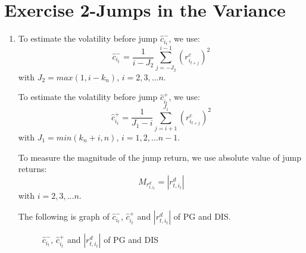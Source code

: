 \documentclass[12pt,letterpaper]{article}
\begin{document}
\section*{Exercise 2-Jumps in the Variance}
  \begin{enumerate}[label=\textbf{(\Alph*)}]
\item To estimate the volatility before jump $\hat{c}_{i_t}^-$, we use:
$$\hat{c}_{i_t}^-=\frac{1}{i-J_2}\sum_{j=-J_2}^{i-1}(r_{i_{t+j}}^c)^2$$
with $J_2=max(1,i-k_n)$, $i=2,3,\dots n$.

To estimate the volatility before jump $\hat{c}_{i_t}^+$, we use:
$$\hat{c}_{i_t}^+=\frac{1}{J_1-i}\sum_{j=i+1}^{J_1}(r_{i_{t+j}}^c)^2$$
with $J_1=min(k_n+i,n)$, $i=1,2,\dots n-1$.

To measure the magnitude of the jump return, we use absolute value of jump returns:
$$M_{r_{t,i_t}^d}=|r_{t,i_t}^d|$$
with $i=2,3,\dots n$.

The following is graph of $\hat{c}_{i_t}^-$, $\hat{c}_{i_t}^+$ and $|r_{t,i_t}^d|$ of PG and DIS.

 \begin{figure}[H]
	\centering
	\caption{ $\hat{c}_{i_t}^-$, $\hat{c}_{i_t}^+$ and $|r_{t,i_t}^d|$ of PG and DIS}
\end{figure}


\end{enumerate}
\end{document}
